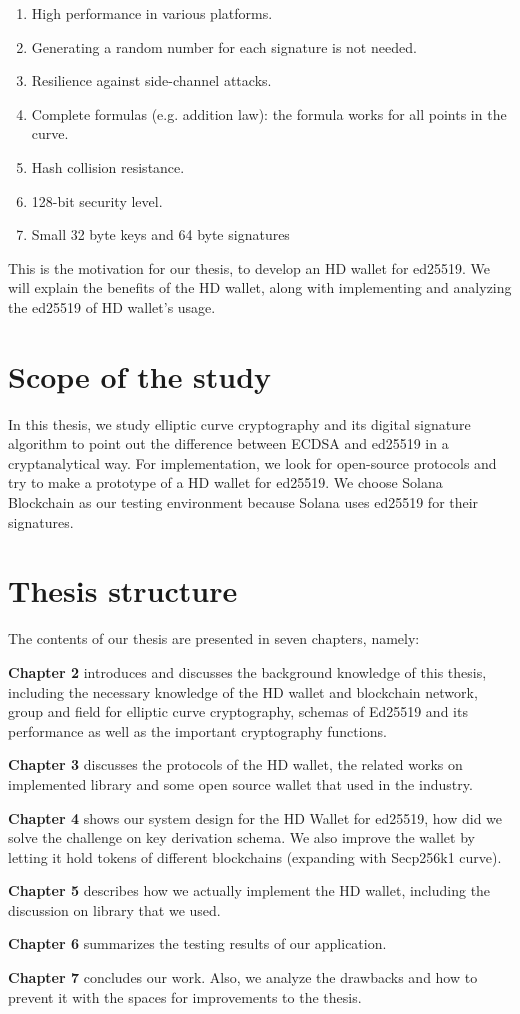 \begin{enumerate}
    \item High performance in various platforms.   
    \item Generating a random number for each signature is not needed.
    \item Resilience against side-channel attacks.
    \item Complete formulas (e.g. addition law): the formula works for all points in the curve.
    \item Hash collision resistance.
    \item 128-bit security level.
    \item Small 32 byte keys and 64 byte signatures
\end{enumerate}
This is the motivation for our thesis, to develop an HD wallet for ed25519. We will explain the benefits of the HD wallet, along with implementing and analyzing the ed25519 of HD wallet’s usage. 

\section{Scope of the study}

In this thesis, we study elliptic curve cryptography and its digital signature algorithm to point out the difference between ECDSA and ed25519 in a cryptanalytical way. For implementation, we look for open-source protocols and try to make a prototype of a HD wallet for ed25519. We choose Solana Blockchain as our testing environment because Solana uses ed25519 for their signatures.

\section{Thesis structure}

The contents of our thesis are presented in seven chapters, namely:

\textbf{Chapter 2} introduces and discusses the background knowledge of this thesis, including the necessary knowledge of the HD wallet and blockchain network, group and field for elliptic curve cryptography, schemas of Ed25519 and its performance as well as the important cryptography functions.

\textbf{Chapter 3} discusses the protocols of the HD wallet, the related works on implemented library and some open source wallet that used in the industry. 

\textbf{Chapter 4} shows our system design for the HD Wallet for ed25519, how did we solve the challenge on key derivation schema. We also improve the wallet by letting it hold tokens of different blockchains (expanding with Secp256k1 curve).

\textbf{Chapter 5} describes how we actually implement the HD wallet, including the discussion on library that we used.

\textbf{Chapter 6} summarizes the testing results of our application.

\textbf{Chapter 7} concludes our work. Also, we analyze the drawbacks and how to prevent it with the spaces for improvements to the thesis.
